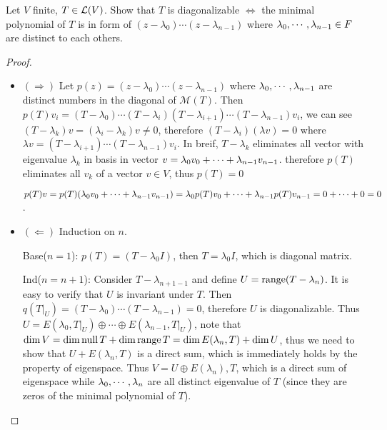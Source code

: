 \documentclass[../main.tex]{subfiles}
\begin{document}
\setcounter{theorem}{61}

\begin{theorem}
  Let $V$ finite, $T \in \mathcal{L}(V)$. Show that $T$ is diagonalizable
  $\iff$ the minimal polynomial of $T$
  is in form of $(z - \lambda_0) \cdots (z - \lambda_{n - 1})$
  where $\lambda_0 , \cdots , \lambda_{n - 1} \in F$ are distinct to each others.
\end{theorem}
\begin{proof}
  ~
  \begin{itemize}
    \item $(\Rightarrow)$ Let $p(z) = (z - \lambda_0) \cdots (z - \lambda_{n - 1})$
          where $\lambda_0 , \cdots , \lambda_{n - 1}$ are distinct numbers in the diagonal of $\mathcal{M}(T)$.
          Then $p(T)v_i = (T - \lambda_0) \cdots (T - \lambda_i) (T - \lambda_{i + 1}) \cdots (T - \lambda_{n - 1})v_i$,
          we can see $(T - \lambda_k)v = (\lambda_i - \lambda_k)v \neq 0$, therefore $(T - \lambda_i)(\lambda v) = 0$
          where $\lambda v = (T - \lambda_{i + 1}) \cdots (T - \lambda_{n - 1})v_i$.
          In breif, $T - \lambda_k$ eliminates all vector with eigenvalue $\lambda_k$ in basis in vector $v = \lambda_0 v_0 + \cdots + \lambda_{n - 1} v_{n - 1}$.
          therefore $p(T)$ eliminates all $v_k$ of a vector $v \in V$, thus $p(T) = 0$

          $p(T)v = p(T)(\lambda_0 v_0 + \cdots + \lambda_{n - 1} v_{n - 1}) = \lambda_0 p(T)v_0 + \cdots + \lambda_{n - 1}p(T)v_{n - 1} = 0 + \cdots + 0 = 0$.
    \item $(\Leftarrow)$ Induction on $n$.

          Base($n = 1$): $p(T) = (T - \lambda_0I)$, then $T = \lambda_0 I$, which is diagonal matrix.

          Ind($n = n + 1$): Consider $T - \lambda_{n + 1 - 1}$ and define $U = \operatorname{range} (T - \lambda_n)$.
          It is easy to verify that $U$ is invariant under $T$.
          Then $q(T\big|_U) = (T - \lambda_0) \cdots (T - \lambda_{n - 1}) = 0$,
          therefore $U$ is diagonalizable.
          Thus $U = E(\lambda_0, T\big|_U) \oplus \cdots \oplus E(\lambda_{n - 1}, T\big|_U)$,
          note that $\dim V = \dim \operatorname{null} T + \dim \operatorname{range} T = \dim E(\lambda_n, T) + \dim U$,
          thus we need to show that $U + E(\lambda_n, T)$ is a direct sum, which is
          immediately holds by the property of eigenspace.
          Thus $V = U \oplus E(\lambda_n), T$, which is a direct sum of eigenspace
          while $\lambda_0 , \cdots , \lambda_{n}$ are all distinct eigenvalue of $T$ (since they are zeros of the minimal polynomial of $T$).
  \end{itemize}
\end{proof}
\end{document}
